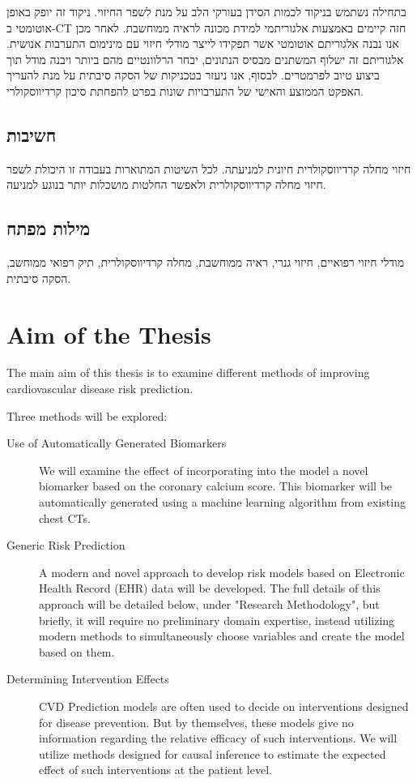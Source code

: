 \documentclass[a4paper,12pt]{article}
\begin{document}
\begin{hebrew}
		בתחילה נשתמש בניקוד לכמות הסידן בעורקי הלב על מנת לשפר החיזוי. ניקוד זה יופק באופן אוטומטי ב-CT חזה קיימים באמצעות אלגוריתמי למידת מכונה לראיה ממוחשבת. לאחר מכן אנו נבנה אלגוריתם אוטומטי אשר תפקידו לייצר מודלי חיזוי עם מינימום התערבות אנושית. אלגוריתם זה ישלוף המשתנים מבסיס הנתונים, יבחר הרלוונטיים מהם ביותר ויבנה מודל תוך ביצוע טיוב לפרמטרים. לבסוף, אנו ניעזר בטכניקות של הסקה סיבתית על מנת להעריך האפקט הממוצע והאישי של התערבויות שונות בפרט להפחתת סיכון קרדיווסקולרי.

		\subsection{\texthebrew{חשיבות}}
		
		חיזוי מחלה קרדיווסקולרית חיונית למניעתה. לכל השיטות המתוארות בעבודה זו היכולת לשפר חיזוי מחלה קרדיווסקולרית ולאפשר החלטות מושכלות יותר בנוגע למניעה. 
			
			\subsection{\texthebrew{מילות מפתח}}
			
			מודלי חיזוי רפואיים, חיזוי גנרי, ראיה ממוחשבת, מחלה קרדיווסקולרית, תיק רפואי ממוחשב, הסקה סיבתית.
		
	\end{hebrew}
	
	\section{Aim of the Thesis}
	
	The main aim of this thesis is to examine different methods of improving cardiovascular disease risk prediction.
	
	Three methods will be explored:
	\begin{description}
		
		\item[Use of Automatically Generated Biomarkers] We will examine the effect of incorporating into the model a novel biomarker based on the coronary calcium score. This biomarker will be automatically generated using a machine learning algorithm from existing chest CTs.
		
		\item[Generic Risk Prediction] A modern and novel approach to develop risk models based on Electronic Health Record (EHR) data will be developed. The full details of this approach will be detailed below, under "Research Methodology", but briefly, it will require no preliminary domain expertise, instead utilizing modern methods to simultaneously choose variables and create the model based on them.
		
		\item[Determining Intervention Effects] CVD Prediction models are often used to decide on interventions designed for disease prevention. But by themselves, these models give no information regarding the relative efficacy of such interventions. We will utilize methods designed for causal inference to estimate the expected effect of such interventions at the patient level.
		
	\end{description}
	
\end{document}
